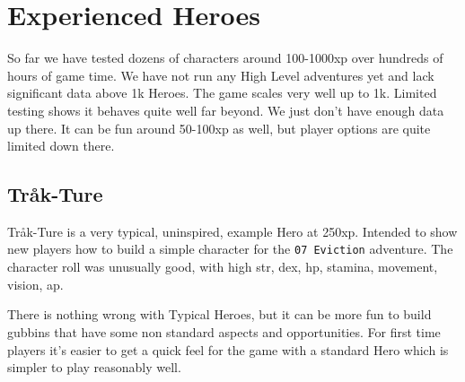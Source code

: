\clearpage
{}
\section*{Experienced Heroes}
So far we have tested dozens of characters around 100-1000xp over hundreds of hours of game time. We have not run any High Level adventures yet and lack significant data above 1k Heroes.
The game scales very well up to 1k. Limited testing shows it behaves quite well far beyond. We just don't have enough data up there.
It can be fun around 50-100xp as well, but player options are quite limited down there.


\subsection*{Tråk-Ture}
Tråk-Ture is a very typical, uninspired, example Hero at 250xp. Intended to show new players how to build a simple character for the \texttt{07 Eviction} adventure. The character roll was unusually good, with high str, dex, hp, stamina, movement, vision, ap.

There is nothing wrong with Typical Heroes, but it can be more fun to build gubbins that have some non standard aspects and opportunities. For first time players it's easier to get a quick feel for the game with a standard Hero which is simpler to play reasonably well.

\


